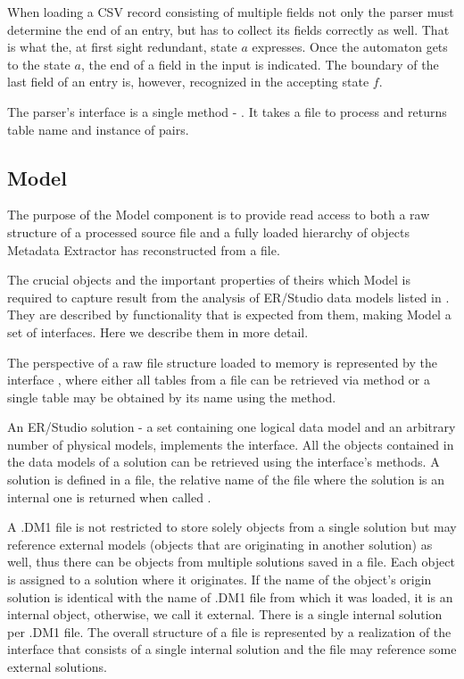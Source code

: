 When loading a CSV record consisting of multiple fields not only the parser must determine the end of an entry, but has to collect its fields correctly as well. That is what the, at first sight redundant, state $a$ expresses. Once the automaton gets to the state $a$, the end of a field in the input is indicated. 
The boundary of the last field of an entry is, however, recognized in the accepting state $f$.

The parser's interface is a single method - . It takes a file to process and returns table name and instance of  pairs.

\subsection{Model}

The purpose of the Model component is to provide read access to both a raw structure of a processed source file and a fully loaded hierarchy of objects Metadata Extractor has reconstructed from a file.

The crucial objects and the important properties of theirs which Model is required to capture result from the analysis of ER/Studio data models listed in . They are described by functionality that is expected from them, making Model a set of interfaces. Here we describe them in more detail.

The perspective of a raw file structure loaded to memory is represented by the interface , where either all tables from a file can be retrieved via  method or a single table may be obtained by its name using the  method.

An ER/Studio solution - a set containing one logical data model and an arbitrary number of physical models, implements the  interface. All the objects contained in the data models of a solution can be retrieved using the interface's methods. A solution is defined in a file, the relative name of the file where the solution is an internal one is returned when called .

A .DM1 file is not restricted to store solely objects from a single solution but may reference external models (objects that are originating in another solution) as well, thus there can be objects from multiple solutions saved in a file. Each object is assigned to a solution where it originates.
If the name of the object's origin solution is identical with the name of .DM1 file from which it was loaded, it is an internal object, otherwise, we call it external. There is a single internal solution per .DM1 file. 
The overall structure of a file is represented by a realization of the  interface that consists of a single internal solution and the file may reference some external solutions.

